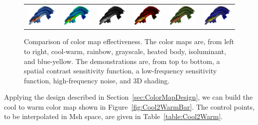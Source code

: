\documentclass{acmsiggraph}               %
\newcommand{\Msh}{Msh\xspace}
\begin{document}
\begin{figure}
\begin{tabular}{c@{\;}c@{\;}c@{\;}c@{\;}c@{\;}c}
    \includegraphics[width=1.1in]{images/Cool2WarmShading} &
    \includegraphics[width=1.1in]{images/RainbowShading} &
    \includegraphics[width=1.1in]{images/GrayscaleShading} &
    \includegraphics[width=1.1in]{images/BlackBodyShading} &
    \includegraphics[width=1.1in]{images/Green2RedShading} &
    \includegraphics[width=1.1in]{images/Blue2YellowShading}
  \end{tabular}
  \caption{Comparison of color map effectiveness.  The color maps are, from
    left to right, cool-warm, rainbow, grayscale, heated body, isoluminant,
    and blue-yellow.  The demonstrations are, from top to bottom, a spatial
    contrast sensitivity function, a low-frequency sensitivity function,
    high-frequency noise, and 3D shading.}
  \label{fig:MapComparison}
\end{figure}

Applying the design described in Section~\ref{sec:ColorMapDesign}, we can
build the cool to warm color map shown in Figure~\ref{fig:Cool2WarmBar}.
The control points, to be interpolated in \Msh space, are given in
Table~\ref{table:Cool2Warm}.
\end{document}
